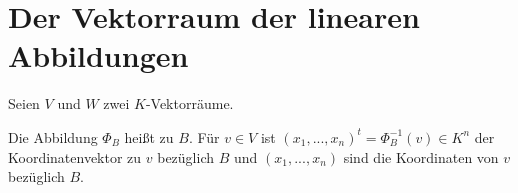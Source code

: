 \section{Der Vektorraum der linearen Abbildungen}

Seien $V$ und $W$ zwei $K$-Vektorräume.

\begin{definition}[Koordinatensystem]
	Die Abbildung $\Phi_B$ heißt  zu $B$. Für $v\in V$ ist 
	$(x_1,...,x_n)^t=\Phi^{-1}_B(v)\in K^n$ der Koordinatenvektor zu $v$ bezüglich $B$ und $(x_1,...,x_n)$ sind die 
	Koordinaten von $v$ bezüglich $B$.
\end{definition}